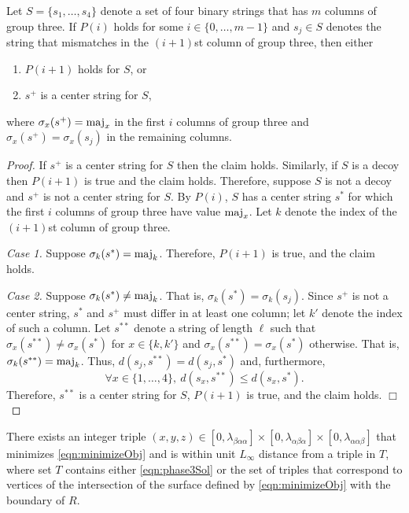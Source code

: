 \begin{lemma}
\label{lem:phase2}
Let $S = \{s_1, \ldots, s_4\}$ denote a set of four binary strings
that has $m$ columns of group three.
If $P(i)$ holds for some $i \in \{0, \ldots , m-1\}$ 
and $s_j \in S$ denotes the string that mismatches in the $(i+1)$st 
column of group three, then either
\begin{enumerate}
\item $P(i+1)$ holds for $S$, or
\item $s^+$ is a center string for $S$,
\end{enumerate}
where $\sigma_x(s^+) = \operatorname{maj}_x$ in the first $i$ columns of group three
and $\sigma_x(s^+) = \sigma_x(s_j)$ in the remaining columns.
\end{lemma}

\begin{proof}
If $s^+$ is a center string for $S$ then the claim holds.
Similarly, if $S$ is a decoy then $P(i+1)$ is true and the claim holds.
Therefore, suppose $S$ is not a decoy and $s^+$ is not a center string for $S$.
By $P(i)$, $S$ has a center string $s^*$ 
for which the first $i$ columns of group three have value $\operatorname{maj}_x$.
Let $k$ denote the index of the $(i+1)$st column of group three.

{\it Case 1.} 
Suppose $\sigma_k(s^*) = \operatorname{maj}_k$.
Therefore, $P(i+1)$ is true, and the claim holds.

{\it Case 2.} 
Suppose $\sigma_k(s^*) \neq \operatorname{maj}_k$. That is, $\sigma_k(s^*) = \sigma_k(s_j)$.
Since $s^+$ is not a center string, 
$s^*$ and $s^+$ must differ in at least one column; 
let $k'$ denote the index of such a column.
Let $s^{**}$ denote a string of length $\ell$ 
such that $\sigma_x(s^{**}) \neq \sigma_x(s^*)$ for $x \in \{k, k'\}$
and $\sigma_x(s^{**}) = \sigma_x(s^*)$ otherwise.
That is, 
$\sigma_k(s^{**}) = \operatorname{maj}_k$.
Thus, $d(s_j, s^{**}) = d(s_j, s^*)$ and, furthermore,
$$\forall x \in \{1, \ldots, 4\}, \ d(s_x, s^{**}) \leq d(s_x, s^*) .$$
Therefore, $s^{**}$ is a center string for $S$,
$P(i+1)$ is true, and the claim holds. \hfill $\Box$ \end{proof} 

\begin{lemma}
\label{lem:phase3}
There exists an integer triple $(x,y,z) \in [0,\lambda_{\beta\alpha\alpha}] 
\times [0,\lambda_{\alpha\beta\alpha}] \times [0,\lambda_{\alpha\alpha\beta}]$
that minimizes \eqref{eqn:minimizeObj}
and is within unit $L_\infty$ distance from a triple in $T$,
where set $T$ contains either \eqref{eqn:phase3Sol}
or the set of triples that correspond to vertices of the
intersection of the surface defined by 
\eqref{eqn:minimizeObj} with the boundary of $R$.
\end{lemma}


